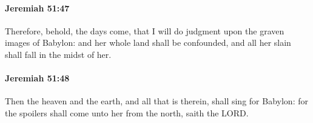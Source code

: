 		\paragraph{Jeremiah 51:47} %
			\label{JEREMIAH-51-47}

			Therefore, behold, the days come, that I will do judgment upon the graven images of Babylon: and her whole land shall be confounded, and all her slain shall fall in the midst of her.


		\paragraph{Jeremiah 51:48} %
			\label{JEREMIAH-51-48}

			Then the heaven and the earth, and all that is therein, shall sing for Babylon: for the spoilers shall come unto her from the north, saith the LORD.


